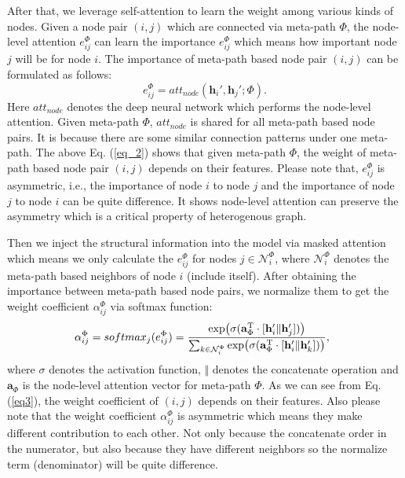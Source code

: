 After that, we leverage self-attention  \cite{attisallyouneed} to learn the weight among various 
kinds of nodes. 
Given a node pair $(i,j)$ which are connected via meta-path $\Phi$,
the node-level attention $e_{ij}^{\Phi}$ can learn the importance $e_{ij}^{\Phi}$ which means how important node $j$ will be for node $i$. The importance of meta-path based node pair $(i,j)$ can be formulated as follows:
\begin{equation}
e_{ij}^{\Phi}=att_{node}( \mathbf{h}_i', \mathbf{h}_j';\Phi).
\label{eq_2}
\end{equation}
Here $att_{node}$ denotes the deep neural network which performs the node-level attention. Given meta-path $\Phi$, $att_{node}$ is shared for all meta-path based node pairs. It is because there are some similar connection patterns under one meta-path. The above Eq. (\ref{eq_2}) shows that given meta-path $\Phi$, the weight of meta-path based node pair $(i,j)$ depends on their features.
Please note that, $e_{ij}^{\Phi}$ is asymmetric, i.e., the importance of node $i$ to node $j$ and the importance of node $j$ to node $i$ can be quite difference. It shows node-level attention can preserve the asymmetry which is a critical property of heterogenous graph.

Then we inject the structural information into the model via
masked attention
which means we only calculate the $e_{ij}^{\Phi}$ for nodes $j\in \mathcal{N}^{\Phi}_i$, where $\mathcal{N}^{\Phi}_i$ denotes the meta-path based neighbors of node $i$ (include itself). After obtaining the importance between meta-path based node pairs, we normalize them to get the weight coefficient $\alpha_{ij}^{\Phi}$ 
via softmax function:
\begin{equation}
\alpha_{ij}^{\Phi}
=softmax_j(e_{ij}^{\Phi})
=\frac{\exp \bigl(\sigma(\mathbf{a}^\mathrm{T}_{\Phi} \cdot [\mathbf{h}_i'\Vert \mathbf{h}_j'])\bigl)}{\sum_{k\in \mathcal{N}_i^{\Phi}} \exp \bigl(\sigma(\mathbf{a}^\mathrm{T}_{\Phi} \cdot [\mathbf{h}_i'\Vert \mathbf{h}_k'])\bigr)},    \\\
\label{eq3}
\end{equation}
where $\sigma$ denotes the activation function, $\Vert$ denotes the concatenate operation and 
$\mathbf{a}_{\Phi}$ is the node-level attention vector for meta-path $\Phi$. As we can see from Eq. (\ref{eq3}), the weight coefficient of $(i,j)$ depends on their features. Also please note that the weight coefficient $\alpha_{ij}^{\Phi}$ is asymmetric which means they make different contribution to each other. Not only because the concatenate order in the numerator, but also because they have different neighbors so the normalize term (denominator) will be quite difference.

